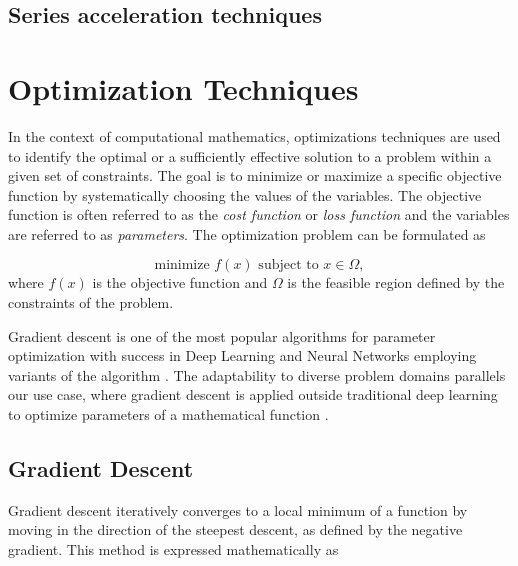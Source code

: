 \documentclass[a4paper]{report}
\begin{document}

\subsection{Series acceleration techniques}


\section{Optimization Techniques}
In the context of computational mathematics, optimizations techniques are used to identify the optimal or a sufficiently effective solution to a problem within a given set of constraints. The goal is to minimize or maximize a specific objective function by systematically choosing the values of the variables. The objective function is often referred to as the \textit{cost function} or \textit{loss function} and the variables are referred to as \textit{parameters}. The optimization problem can be formulated as

\begin{equation}\label{optimization_problem}
	\text{minimize } f(x) \text{ subject to } x \in \Omega,
\end{equation}
where $f(x)$ is the objective function and $\Omega$ is the feasible region defined by the constraints of the problem.

Gradient descent is one of the most popular algorithms for parameter optimization with success in Deep Learning and Neural Networks employing variants of the algorithm \citep{lu2017improved, zhang2019gradient, zeebaree2019trainable}. The adaptability to diverse problem domains \citep{YingjieYugiHaibin2023SGD} parallels our use case, where gradient descent is applied outside traditional deep learning to optimize parameters of a mathematical function \citep{GradientBasedOpt2022}.

\subsection{Gradient Descent}
Gradient descent iteratively converges to a local minimum of a function by moving in the direction of the steepest descent, as defined by the negative gradient. This method is expressed mathematically as
\end{document}
